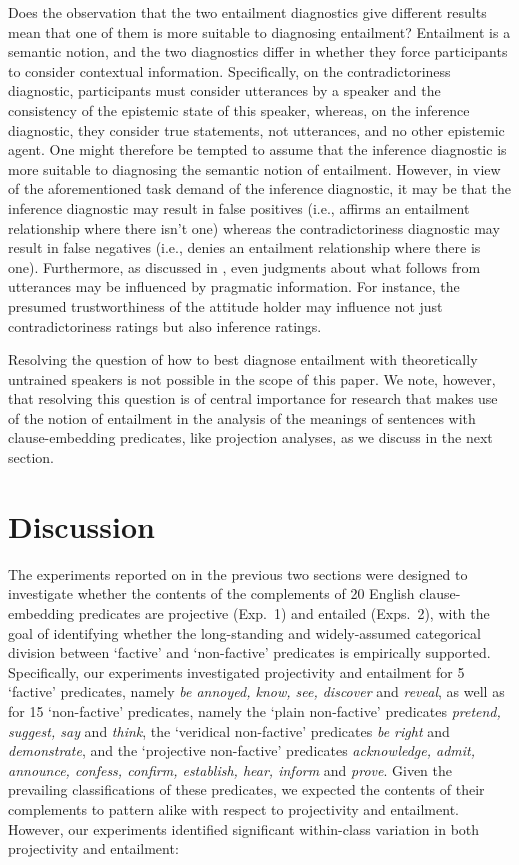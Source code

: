 \documentclass[11pt,fleqn]{article}
\newcommand{\6}{\mbox{$[\hspace*{-.6mm}[$}}
\newcommand{\9}{\mbox{$]\hspace*{-.6mm}]$}}
\begin{document}
{Does the observation that the two entailment diagnostics give different results mean that one of them is more suitable to diagnosing entailment?  Entailment is a semantic notion, and the two diagnostics differ in whether they force participants to consider contextual information. Specifically, on the contradictoriness diagnostic, participants must consider utterances by a speaker and the consistency of the epistemic state of this speaker, whereas, on the inference diagnostic, they consider true statements, not utterances, and no other epistemic agent. One might therefore be tempted to assume that the inference diagnostic is more suitable to diagnosing the semantic notion of entailment. However, in view of the aforementioned task demand of the inference diagnostic, it may be that the inference diagnostic may result in false positives (i.e., affirms an entailment relationship where there isn't one) whereas the contradictoriness diagnostic may result in false negatives (i.e., denies an entailment relationship where there is one). Furthermore, as discussed in \citealt{demarneffe-etal2012}, even judgments about what follows from utterances may be influenced by pragmatic information. For instance, the presumed trustworthiness of the attitude holder may influence not just contradictoriness ratings but also inference ratings.

Resolving the question of how to best diagnose entailment with theoretically untrained speakers is not possible in the scope of this paper. We note, however, that resolving this question is of central importance for research that makes use of the notion of entailment in the analysis of the meanings of sentences with clause-embedding predicates, like projection analyses, as we discuss in the next section.

\section{Discussion}\label{s4}

The experiments reported on in the previous two sections were designed to investigate whether the contents of the complements of 20 English clause-embedding predicates are projective (Exp.~1) and entailed (Exps.~2), with the goal of identifying whether the long-standing and widely-assumed categorical division between `factive' and `non-factive' predicates is empirically supported. Specifically, our experiments investigated projectivity and entailment for 5 `factive' predicates, namely {\em be annoyed, know, see, discover} and {\em reveal}, as well as for 15 `non-factive' predicates, namely the `plain non-factive' predicates {\em pretend, suggest, say} and {\em think}, the `veridical non-factive' predicates {\em be right} and {\em demonstrate}, and the `projective non-factive' predicates {\em acknowledge, admit, announce, confess, confirm, establish, hear, inform} and {\em prove}. Given the prevailing classifications of these predicates, we expected the contents of their complements to pattern alike with respect to projectivity and entailment. However, our experiments identified significant within-class variation in both projectivity and entailment:

}
\end{document}
